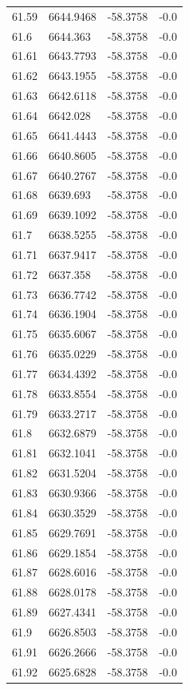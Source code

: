 \begin{table}[H]
\begin{tabular}{llll}
61.59 & 6644.9468 & -58.3758 & -0.0 \\
61.6 & 6644.363 & -58.3758 & -0.0 \\
61.61 & 6643.7793 & -58.3758 & -0.0 \\
61.62 & 6643.1955 & -58.3758 & -0.0 \\
61.63 & 6642.6118 & -58.3758 & -0.0 \\
61.64 & 6642.028 & -58.3758 & -0.0 \\
61.65 & 6641.4443 & -58.3758 & -0.0 \\
61.66 & 6640.8605 & -58.3758 & -0.0 \\
61.67 & 6640.2767 & -58.3758 & -0.0 \\
61.68 & 6639.693 & -58.3758 & -0.0 \\
61.69 & 6639.1092 & -58.3758 & -0.0 \\
61.7 & 6638.5255 & -58.3758 & -0.0 \\
61.71 & 6637.9417 & -58.3758 & -0.0 \\
61.72 & 6637.358 & -58.3758 & -0.0 \\
61.73 & 6636.7742 & -58.3758 & -0.0 \\
61.74 & 6636.1904 & -58.3758 & -0.0 \\
61.75 & 6635.6067 & -58.3758 & -0.0 \\
61.76 & 6635.0229 & -58.3758 & -0.0 \\
61.77 & 6634.4392 & -58.3758 & -0.0 \\
61.78 & 6633.8554 & -58.3758 & -0.0 \\
61.79 & 6633.2717 & -58.3758 & -0.0 \\
61.8 & 6632.6879 & -58.3758 & -0.0 \\
61.81 & 6632.1041 & -58.3758 & -0.0 \\
61.82 & 6631.5204 & -58.3758 & -0.0 \\
61.83 & 6630.9366 & -58.3758 & -0.0 \\
61.84 & 6630.3529 & -58.3758 & -0.0 \\
61.85 & 6629.7691 & -58.3758 & -0.0 \\
61.86 & 6629.1854 & -58.3758 & -0.0 \\
61.87 & 6628.6016 & -58.3758 & -0.0 \\
61.88 & 6628.0178 & -58.3758 & -0.0 \\
61.89 & 6627.4341 & -58.3758 & -0.0 \\
61.9 & 6626.8503 & -58.3758 & -0.0 \\
61.91 & 6626.2666 & -58.3758 & -0.0 \\
61.92 & 6625.6828 & -58.3758 & -0.0 \\

\end{tabular}
\end{table}
